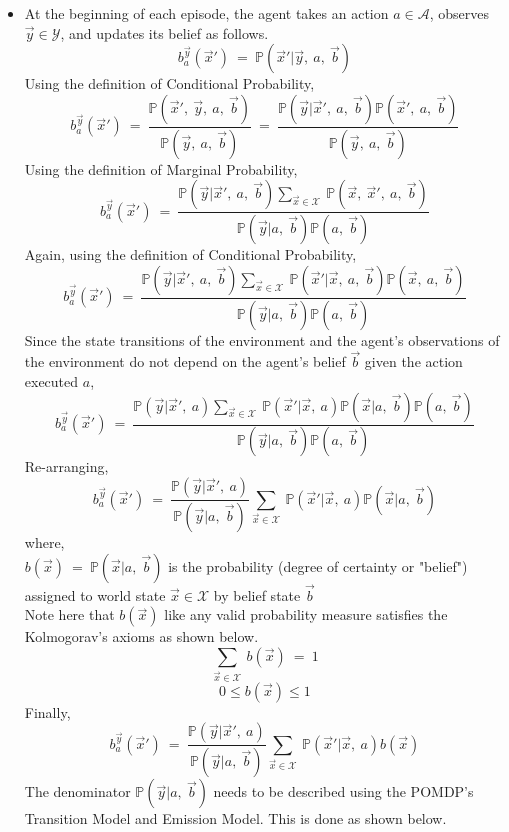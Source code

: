 \documentclass[12pt, draftcls, onecolumn]{IEEEtran}
\begin{document}
\begin{itemize}
    \item At the beginning of each episode, the agent takes an action $a \in \mathcal{A}$, observes $\vec{y} \in \mathcal{Y}$, and updates its belief as follows.
    \[b_a^{\vec{y}}(\vec{x}')\ =\ \mathbb{P}(\vec{x}'|\vec{y},\ a,\ \vec{b})\]
    Using the definition of Conditional Probability,
    \[b_a^{\vec{y}}(\vec{x}')\ =\ \frac{\mathbb{P}(\vec{x}',\ \vec{y},\ a,\ \vec{b})}{\mathbb{P}(\vec{y},\ a,\ \vec{b})}\ =\ \frac{\mathbb{P}(\vec{y}|\vec{x}',\ a,\ \vec{b})\mathbb{P}(\vec{x}',\ a,\ \vec{b})}{\mathbb{P}(\vec{y},\ a,\ \vec{b})}\]
    Using the definition of Marginal Probability,
    \[b_a^{\vec{y}}(\vec{x}')\ =\ \frac{\mathbb{P}(\vec{y}|\vec{x}',\ a,\ \vec{b})\sum_{\vec{x} \in \mathcal{X}}\ \mathbb{P}(\vec{x},\ \vec{x}',\ a,\ \vec{b})}{\mathbb{P}(\vec{y}|a,\ \vec{b})\mathbb{P}(a,\ \vec{b})}\]
    Again, using the definition of Conditional Probability,
    \[b_a^{\vec{y}}(\vec{x}')\ =\ \frac{\mathbb{P}(\vec{y}|\vec{x}',\ a,\ \vec{b})\sum_{\vec{x} \in \mathcal{X}}\ \mathbb{P}(\vec{x}'|\vec{x},\ a,\ \vec{b})\mathbb{P}(\vec{x},\ a,\ \vec{b})}{\mathbb{P}(\vec{y}|a,\ \vec{b})\mathbb{P}(a,\ \vec{b})}\]
    Since the state transitions of the environment and the agent's observations of the environment do not depend on the agent's belief $\vec{b}$ given the action executed $a$,
    \[b_a^{\vec{y}}(\vec{x}')\ =\ \frac{\mathbb{P}(\vec{y}|\vec{x}',\ a)\sum_{\vec{x} \in \mathcal{X}}\ \mathbb{P}(\vec{x}'|\vec{x},\ a)\mathbb{P}(\vec{x}|a,\ \vec{b})\mathbb{P}(a,\ \vec{b})}{\mathbb{P}(\vec{y}|a,\ \vec{b})\mathbb{P}(a,\ \vec{b})}\]
    Re-arranging,
    \[b_a^{\vec{y}}(\vec{x}')\ =\ \frac{\mathbb{P}(\vec{y}|\vec{x}',\ a)}{\mathbb{P}(\vec{y}|a,\ \vec{b})}\sum_{\vec{x} \in \mathcal{X}}\ \mathbb{P}(\vec{x}'|\vec{x},\ a)\mathbb{P}(\vec{x}|a,\ \vec{b})\]
    where,
    \\$b(\vec{x})\ =\ \mathbb{P}(\vec{x}|a,\ \vec{b})$ is the probability (degree of certainty or "belief") assigned to world state $\vec{x} \in \mathcal{X}$ by belief state $\vec{b}$
    \\Note here that $b(\vec{x})$ like any valid probability measure satisfies the Kolmogorav's axioms as shown below.
    \[\sum_{\vec{x} \in \mathcal{X}}\ b(\vec{x})\ =\ 1\]
    \[0 \leq b(\vec{x}) \leq 1\]
    Finally,
    \[b_a^{\vec{y}}(\vec{x}')\ =\ \frac{\mathbb{P}(\vec{y}|\vec{x}',\ a)}{\mathbb{P}(\vec{y}|a,\ \vec{b})}\sum_{\vec{x} \in \mathcal{X}}\ \mathbb{P}(\vec{x}'|\vec{x},\ a)b(\vec{x})\]
    The denominator $\mathbb{P}(\vec{y}|a,\ \vec{b})$ needs to be described using the POMDP's Transition Model and Emission Model. This is done as shown below.

\end{itemize}
\end{document}
